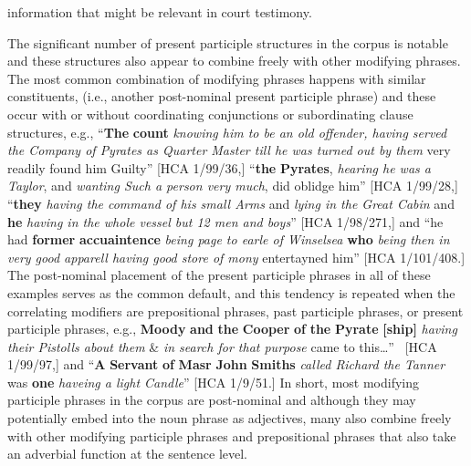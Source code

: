 information that might be relevant in court testimony. 

  The significant number of present participle structures in the corpus is notable and these structures also appear to combine freely with other modifying phrases. The most common combination of modifying phrases happens with similar constituents, (i.e., another post-nominal present participle phrase) and these occur with or without coordinating conjunctions or subordinating clause structures, e.g.,  “\textbf{The} \textbf{count} \textit{knowing him to be an old offender, having served the Company of Pyrates as Quarter Master till he was turned out by them} very readily found him Guilty” [HCA 1/99/36,] “\textbf{the} \textbf{Pyrates}, \textit{hearing he was a Taylor}, and \textit{wanting Such a person very much}, did oblidge him” [HCA 1/99/28,] “\textbf{they} \textit{having the command of his small Arms} and \textit{lying in the Great Cabin} and \textbf{he} \textit{having in the whole vessel but 12 men and boys}” [HCA 1/98/271,] and “he had \textbf{former} \textbf{accuaintence} \textit{being page to earle of Winselsea} \textbf{who} \textit{being then in very good apparell having good store of mony} entertayned him” [HCA 1/101/408.] The post-nominal placement of the present participle phrases in all of these examples serves as the common default, and this tendency is repeated when the correlating modifiers are prepositional phrases, past participle phrases, or present participle phrases, e.g., \textbf{Moody} \textbf{and} \textbf{the} \textbf{Cooper} \textbf{of} \textbf{the} \textbf{Pyrate} \textbf{[ship]} \textit{having their Pistolls about them} \& \textit{in search for that purpose} came to this…” ~[HCA 1/99/97,] and “\textbf{A} \textbf{Servant} \textbf{of} \textbf{Masr} \textbf{John} \textbf{Smiths} \textit{called Richard the Tanner} was \textbf{one} \textit{haveing a light Candle}” [HCA 1/9/51.] In short, most modifying participle phrases in the corpus are post-nominal and although they may potentially embed into the noun phrase as adjectives, many also combine freely with other modifying participle phrases and prepositional phrases that also take an adverbial function at the sentence level. 

